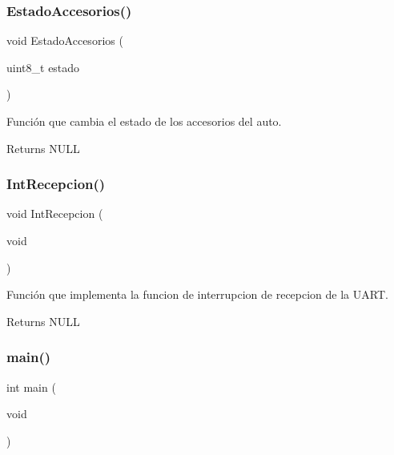 \subsubsection{Estado\+Accesorios()}
{\footnotesize\ttfamily void Estado\+Accesorios (\begin{DoxyParamCaption}\item[{uint8\+\_\+t}]{estado }\end{DoxyParamCaption})}



Función que cambia el estado de los accesorios del auto. 

\begin{DoxyReturn}{Returns}
N\+U\+LL 
\end{DoxyReturn}
\mbox{\label{group__ejemplos_ga4c4b4860e46d2b6e73b78060ddfccde8}} 
\subsubsection{Int\+Recepcion()}
{\footnotesize\ttfamily void Int\+Recepcion (\begin{DoxyParamCaption}\item[{void}]{ }\end{DoxyParamCaption})}



Función que implementa la funcion de interrupcion de recepcion de la U\+A\+RT. 

\begin{DoxyReturn}{Returns}
N\+U\+LL 
\end{DoxyReturn}
\mbox{\label{group__ejemplos_ga840291bc02cba5474a4cb46a9b9566fe}} 
\subsubsection{main()}
{\footnotesize\ttfamily int main (\begin{DoxyParamCaption}\item[{void}]{ }\end{DoxyParamCaption})}

\mbox{\label{group__ejemplos_ga00922fe46c34eb1843ac9068b21b3155}} 
